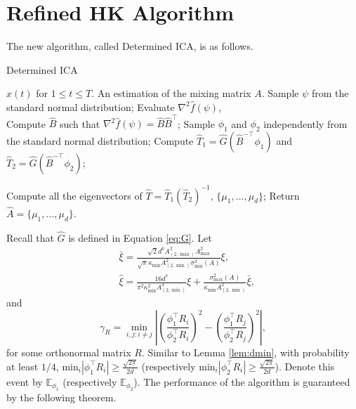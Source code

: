 \documentclass[twoside]{article}
\newcommand{\Ephione}{\mathbb{E}_{\phi_1}}
\newcommand{\Ephitwo}{\mathbb{E}_{\phi_2}}
\theoremstyle{definition}
\begin{document}
\section{Refined HK Algorithm}
\label{sec:DICA}
The new algorithm, called Determined ICA, is as follows. 
\begin{algorithm}[H]
\caption{Determined ICA}
\begin{algorithmic}[1]
\INPUT $x(t)$ for $1\le t \le T$. 
\OUTPUT An estimation of the mixing matrix $A$. 
\STATE Sample $\psi$ from the standard normal distribution;
\STATE Evaluate $\nabla^2\widehat{f}(\psi)$, \\
\STATE Compute $\widehat{B}$ such that $\nabla^2\widehat{f}(\psi) = \widehat{B}\widehat{B}^{\top}$;
\STATE Sample $\phi_1$ and $\phi_2$ independently from the standard normal distribution;
\STATE Compute $\widehat{T}_1 = \widehat{G}(\widehat{B}^{-\top}\phi_1)$ and  $\widehat{T}_2 =\widehat{G}(\widehat{B}^{-\top}\phi_2)$;

\STATE Compute all the eigenvectors of $\widehat{T} = \widehat{T}_1\left(\widehat{T}_2\right)^{-1}$, $\{\mu_1,\ldots,\mu_d\}$;
\STATE Return $\widehat{A} = \{\mu_1,\ldots,\mu_d\}$.
\end{algorithmic}
\end{algorithm}
Recall that $\widehat{G}$ is defined in Equation \ref{eq:G}.
Let 
\begin{align*}
& \bar{\xi} =   \frac{\sqrt{2}d^6A_{(2,\max)}^2A_{\max}^2}{\sqrt{\pi}\kappa_{\min}A^2_{(2,\min)}\sigma_{\min}^2(A)}\xi, \\
& \widehat{\xi} = \frac{16d^7}{\pi^2\kappa_{\min}^2A^4_{(2,\min)}}\xi + \frac{\sigma_{\max}^2(A)}{\kappa_{\min}A^2_{(2,\min)}}\bar{\xi},
\end{align*} 
and 
\begin{equation}
\label{def:gammaR}
\gamma_R =  \min_{i,j: i\neq j} \left\vert \left(\frac{\phi_1^{\top}R_i}{\phi_2^{\top}R_i}\right)^2 - \left(\frac{\phi_1^{\top}R_j}{\phi_2^{\top}R_j}\right)^2 \right\vert, 
\end{equation}
for some orthonormal matrix $R$.
Similar to Lemma \ref{lem:dmin}, with probability at least $1/4$, $\text{min}_i |\phi_1^{\top}R_i| \ge \frac{\sqrt{2\pi}}{2d}$ (respectively $\text{min}_i |\phi_2^{\top}R_i| \ge \frac{\sqrt{2\pi}}{2d}$). 
Denote this event by $\Ephione$ (respectively $\Ephitwo$).
The performance of the algorithm is guaranteed by the following theorem.
\end{document}
